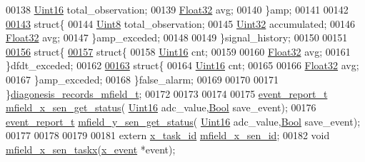 \begin{DoxyCode}
00138         \hyperlink{a00072_a59a9f6be4562c327cbfb4f7e8e18f08b}{Uint16}                 total\_observation;
00139         \hyperlink{a00072_a87d38f886e617ced2698fc55afa07637}{Float32}                avg;
00140         \}amp;
00141 
00142 
\hypertarget{a00019_source_l00143}{}\hyperlink{a00019}{00143}         \textcolor{keyword}{struct}\{
00144             \hyperlink{a00072_af84840501dec18061d18a68c162a8fa2}{Uint8}                  total\_observation;
00145             \hyperlink{a00072_aba99025e657f892beb7ff31cecf64653}{Uint32}                 accumulated;
00146             \hyperlink{a00072_a87d38f886e617ced2698fc55afa07637}{Float32}                avg;
00147         \}amp\_exceded;
00148 
00149     \}signal\_history;
00150 
00151 
\hypertarget{a00019_source_l00156}{}\hyperlink{a00019}{00156}         \textcolor{keyword}{struct}\{
\hypertarget{a00019_source_l00157}{}\hyperlink{a00019}{00157}             \textcolor{keyword}{struct}\{
00158                 \hyperlink{a00072_a59a9f6be4562c327cbfb4f7e8e18f08b}{Uint16}                 cnt;
00159 
00160                 \hyperlink{a00072_a87d38f886e617ced2698fc55afa07637}{Float32}                avg;
00161             \}dfdt\_exceded;
00162 
\hypertarget{a00019_source_l00163}{}\hyperlink{a00019}{00163}             \textcolor{keyword}{struct}\{
00164                 \hyperlink{a00072_a59a9f6be4562c327cbfb4f7e8e18f08b}{Uint16}                 cnt;
00165         
00166                 \hyperlink{a00072_a87d38f886e617ced2698fc55afa07637}{Float32}                avg;
00167             \}amp\_exceded;
00168         \}false\_alarm;
00169 
00170 
00171 \}\hyperlink{a00019_d9/dc1/a00388}{diagonesis\_records\_mfield\_t};
00172 
00173 
00174 
00175 \hyperlink{a00021_d6/d66/a00441}{event\_report\_t} \hyperlink{a00019_a3a46d0e69b27b3566e6d8465cf7a8b0a}{mfield\_x\_sen\_get\_status}(
      \hyperlink{a00072_a59a9f6be4562c327cbfb4f7e8e18f08b}{Uint16} adc\_value,\hyperlink{a00072_a253b248072cfc8bd812c69acd0046eed}{Bool} save\_event);
00176 \hyperlink{a00021_d6/d66/a00441}{event\_report\_t} \hyperlink{a00019_ac7134882964fedc18be6c75547987a2c}{mfield\_y\_sen\_get\_status}(
      \hyperlink{a00072_a59a9f6be4562c327cbfb4f7e8e18f08b}{Uint16} adc\_value,\hyperlink{a00072_a253b248072cfc8bd812c69acd0046eed}{Bool} save\_event);
00177 
00178 
00179 
00181 \textcolor{keyword}{extern} \hyperlink{a00036_ad5c3c5fbfd3e4aadf22830395484a71d}{x\_task\_id} \hyperlink{a00019_a19a33e680bf19d1aed76750132ed8b64}{mfield\_x\_sen\_id};
00182 \textcolor{keywordtype}{void} \hyperlink{a00019_a72e9235043dc4a8469143a6eb48bf117}{mfield\_x\_sen\_taskx}(\hyperlink{a00036_de/d37/a00849}{x\_event} *event);

\end{DoxyCode}

